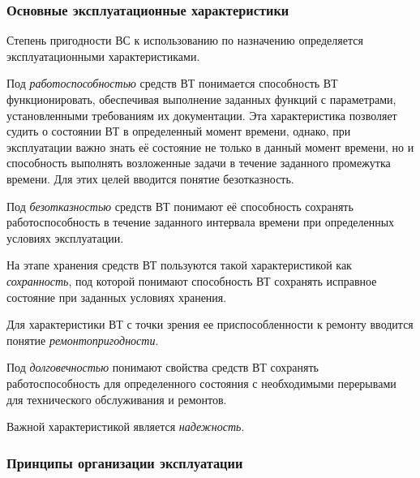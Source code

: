 \documentclass[a4paper,14pt]{extarticle}
\begin{document}
\subsubsection*{Основные эксплуатационные характеристики}

Степень пригодности ВС к использованию по назначению определяется эксплуатационными характеристиками.

Под \textit{работоспособностью} средств ВТ понимается способность ВТ функционировать, обеспечивая выполнение заданных функций с параметрами, установленными требованиям их документации. Эта характеристика позволяет судить о состоянии ВТ в определенный момент времени, однако, при эксплуатации важно знать её состояние не только в данный момент времени, но и способность выполнять возложенные задачи в течение заданного промежутка времени. Для этих целей вводится понятие безотказность.

Под \textit{безотказностью} средств ВТ понимают её способность сохранять работоспособность в течение заданного интервала времени при определенных условиях эксплуатации.

На этапе хранения средств ВТ пользуются такой характеристикой как \textit{сохранность}, под которой понимают способность ВТ сохранять исправное состояние при заданных условиях хранения.

Для характеристики ВТ с точки зрения ее приспособленности к ремонту вводится понятие \textit{ремонтопригодности}.

Под \textit{долговечностью} понимают свойства средств ВТ сохранять работоспособность для определенного состояния с необходимыми перерывами для технического обслуживания и ремонтов.

Важной характеристикой является \textit{надежность}.

\subsubsection*{Принципы организации эксплуатации}
\end{document}
